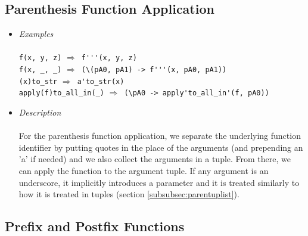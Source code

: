 \documentclass[diploma]{softlab-thesis}
\def\lra{$\Longrightarrow$\ }
\begin{document}
\newpage
\subsection{Parenthesis Function Application}

\begin{itemize}
\item
\textit{Examples}\\\\
\verb|f(x, y, z)| \lra \verb|f'''(x, y, z)| \\
\verb|f(x, _, _)| \lra \verb|(\(pA0, pA1) -> f'''(x, pA0, pA1))| \\
\verb|(x)to_str| \lra \verb|a'to_str(x)| \\
\verb|apply(f)to_all_in(_)| \lra \verb|(\pA0 -> apply'to_all_in'(f, pA0))| \\

\item
\textit{Description}\\\\
For the parenthesis function application, we separate the underlying function
identifier by putting quotes in the place of the arguments (and prepending an
'a' if needed) and we also collect the arguments in a tuple. From there, we can
apply the function to the argument tuple. If any argument is an underscore, it
implicitly introduces a parameter and it is treated similarly to how it is
treated in tuples (section \ref{subsubsec:parentuplist}).

\end{itemize}

\subsection{Prefix and Postfix Functions}
\label{subsubsec:prepostfuncs}
\end{document}
